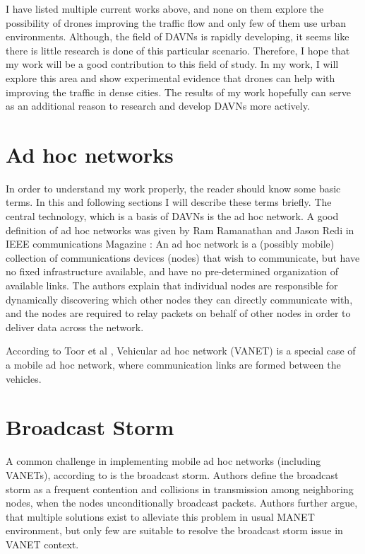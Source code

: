 \documentclass[]{nsm-thesis}
\begin{document}
I have listed multiple current works above, and none on them explore the possibility of drones improving the traffic flow and only few of them use urban environments. Although, the field of \acp{DAVN} is rapidly developing, it seems like there is little research is done of this particular scenario. Therefore, I hope that my work will be a good contribution to this field of study. In my work, I will explore this area and show experimental evidence that drones can help with improving the traffic in dense cities. The results of my work hopefully can serve as an additional reason to research and develop \acp{DAVN} more actively.


\section{Ad hoc networks}

In order to understand my work properly, the reader should know some basic terms. In this and following sections I will describe these terms briefly. The central technology, which is a basis of \acp{DAVN} is the ad hoc network. A good definition of ad hoc networks was given by Ram Ramanathan and Jason Redi in IEEE communications Magazine \cite{ramanathan2002brief}: An ad hoc network is a (possibly mobile) collection of communications devices (nodes) that wish to communicate, but have no fixed infrastructure available, and have no pre-determined organization of available links. The authors explain that individual nodes are responsible for dynamically discovering which other nodes they can directly communicate with, and the nodes are required to relay packets on behalf of other nodes in order to deliver data across the network.

According to Toor et al \cite{toor2008}, Vehicular ad hoc network (\ac{VANET}) is a special case of a mobile ad hoc network, where communication links are formed between the vehicles.



\section{Broadcast Storm}

A common challenge in implementing mobile ad hoc networks (including \acp{VANET}), according to \textcite{wisitrophan2007} is the broadcast storm. Authors define the broadcast storm as a frequent contention and collisions in transmission among neighboring nodes, when the nodes unconditionally broadcast packets. Authors further argue, that multiple solutions exist to alleviate this problem in usual \ac{MANET} environment, but only few are suitable to resolve the broadcast storm issue in \ac{VANET} context.
\end{document}
